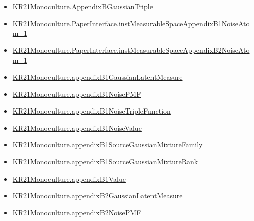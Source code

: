 \documentclass[10pt]{article}
\begin{document}
\begin{itemize}
\item \hyperlink{governing-declaration-4ebcacb6f266705a}{KR21\allowbreak{}Monoculture.\allowbreak{}Appendix\allowbreak{}B\allowbreak{}Gaussian\allowbreak{}Triple}
\item \hyperlink{governing-declaration-5e8427562a63213a}{KR21\allowbreak{}Monoculture.\allowbreak{}Paper\allowbreak{}Interface.\allowbreak{}inst\allowbreak{}Measurable\allowbreak{}Space\allowbreak{}Appendix\allowbreak{}B1\allowbreak{}Noise\allowbreak{}Atom\_\allowbreak{}1}
\item \hyperlink{governing-declaration-ad9ed5e37782f4c5}{KR21\allowbreak{}Monoculture.\allowbreak{}Paper\allowbreak{}Interface.\allowbreak{}inst\allowbreak{}Measurable\allowbreak{}Space\allowbreak{}Appendix\allowbreak{}B2\allowbreak{}Noise\allowbreak{}Atom\_\allowbreak{}1}
\item \hyperlink{governing-declaration-0bab8a9a9619ec52}{KR21\allowbreak{}Monoculture.\allowbreak{}appendix\allowbreak{}B1\allowbreak{}Gaussian\allowbreak{}Latent\allowbreak{}Measure}
\item \hyperlink{governing-declaration-ccbcf874b950aaac}{KR21\allowbreak{}Monoculture.\allowbreak{}appendix\allowbreak{}B1\allowbreak{}Noise\allowbreak{}PMF}
\item \hyperlink{governing-declaration-c73f18d8ae75d762}{KR21\allowbreak{}Monoculture.\allowbreak{}appendix\allowbreak{}B1\allowbreak{}Noise\allowbreak{}Triple\allowbreak{}Function}
\item \hyperlink{governing-declaration-6e19dd667db2a775}{KR21\allowbreak{}Monoculture.\allowbreak{}appendix\allowbreak{}B1\allowbreak{}Noise\allowbreak{}Value}
\item \hyperlink{governing-declaration-4e549d6bd2081264}{KR21\allowbreak{}Monoculture.\allowbreak{}appendix\allowbreak{}B1\allowbreak{}Source\allowbreak{}Gaussian\allowbreak{}Mixture\allowbreak{}Family}
\item \hyperlink{governing-declaration-4b368d0711b5f635}{KR21\allowbreak{}Monoculture.\allowbreak{}appendix\allowbreak{}B1\allowbreak{}Source\allowbreak{}Gaussian\allowbreak{}Mixture\allowbreak{}Rank}
\item \hyperlink{governing-declaration-c2461f284c18c0e0}{KR21\allowbreak{}Monoculture.\allowbreak{}appendix\allowbreak{}B1\allowbreak{}Value}
\item \hyperlink{governing-declaration-e543890fa54a6b76}{KR21\allowbreak{}Monoculture.\allowbreak{}appendix\allowbreak{}B2\allowbreak{}Gaussian\allowbreak{}Latent\allowbreak{}Measure}
\item \hyperlink{governing-declaration-8e6ec30fddce1699}{KR21\allowbreak{}Monoculture.\allowbreak{}appendix\allowbreak{}B2\allowbreak{}Noise\allowbreak{}PMF}

\end{itemize}
\end{document}
